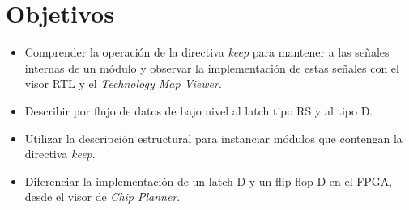 \section{Objetivos \label{sec:obj}}


\begin{itemize} 
	\item Comprender la operación de la directiva \textit{keep} para mantener a las señales internas de un módulo y observar la implementación de estas señales con el visor RTL y el \textit{Technology Map Viewer}.
	
	\item Describir por flujo de datos de bajo nivel al latch tipo RS y al tipo D.
	
	\item Utilizar la descripción estructural para instanciar módulos que contengan la directiva \textit{keep}.
	
	\item Diferenciar la implementación de un latch D y un flip-flop D en el FPGA, desde el visor de \textit{Chip Planner}.
\end{itemize}